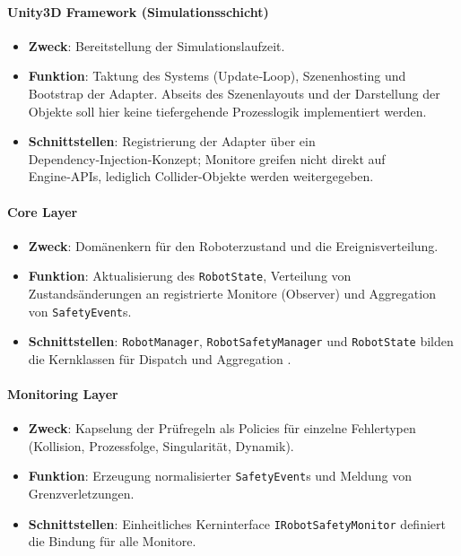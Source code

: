 
\paragraph{Unity3D Framework (Simulationsschicht)}
\begin{itemize}
  \item \textbf{Zweck}: Bereitstellung der Simulationslaufzeit.
  \item \textbf{Funktion}: Taktung des Systems (Update‑Loop),
    Szenenhosting und Bootstrap der Adapter. Abseits des
    Szenenlayouts und der Darstellung der Objekte soll hier keine
    tiefergehende Prozesslogik implementiert werden.
  \item \textbf{Schnittstellen}: Registrierung der Adapter über ein
    Dependency‑Injection‑Konzept; Monitore greifen nicht direkt auf
    Engine‑APIs, lediglich Collider-Objekte werden weitergegeben.
\end{itemize}

\paragraph{Core Layer}
\begin{itemize}
  \item \textbf{Zweck}: Domänenkern für den Roboterzustand und die
    Ereignisverteilung.
  \item \textbf{Funktion}: Aktualisierung des
    \texttt{RobotState}, Verteilung von Zustandsänderungen an
    registrierte Monitore (Observer) und Aggregation von \texttt{SafetyEvent}s.
  \item \textbf{Schnittstellen}: \texttt{RobotManager},
    \texttt{RobotSafetyManager} und \texttt{RobotState} bilden die
    Kernklassen für Dispatch und Aggregation .
\end{itemize}

\paragraph{Monitoring Layer}
\begin{itemize}
  \item \textbf{Zweck}: Kapselung der Prüfregeln als Policies für
    einzelne Fehlertypen (Kollision, Prozessfolge, Singularität, Dynamik).
  \item \textbf{Funktion}: Erzeugung normalisierter
    \texttt{SafetyEvent}s und Meldung von Grenzverletzungen.
  \item \textbf{Schnittstellen}: Einheitliches Kerninterface
    \texttt{IRobotSafetyMonitor} definiert die Bindung für alle Monitore.
\end{itemize}

